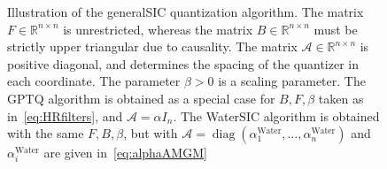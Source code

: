 \documentclass[journal]{IEEEtran}
\newcommand{\RR}{\mathbb{R}}
\newcommand{\diag}{\mathop{\mathrm{diag}}}
\newcommand{\m}{\mathcal}
\newcommand{\Or}[1]{{\color{cyan}  #1}}
\begin{document}
\begin{figure}


   \caption{Illustration of the generalSIC quantization algorithm. The matrix $F\in\RR^{n\times n}$ is unrestricted, whereas the matrix $B\in\RR^{n\times n}$ must be strictly upper triangular due to causality. The matrix $\m{A}\in\RR^{n\times n}$ is positive diagonal, and determines the spacing of the quantizer in each coordinate. The parameter $\beta>0$ is a scaling parameter. The GPTQ algorithm is obtained as a special case for $B,F,\beta$ taken as in~\eqref{eq:HRfilters}, and $\m{A}=\alpha I_n$. The WaterSIC algorithm is obtained with the same $F,B,\beta$, but with $\m{A}=\diag(\alpha_1^{\text{Water}},\ldots,\alpha_n^{\text{Water}})$ and $\alpha_i^{\text{Water}}$ are given in~\eqref{eq:alphaAMGM}}
  \label{fig:SICffedfe}
\end{figure}

\medskip

\end{document}
